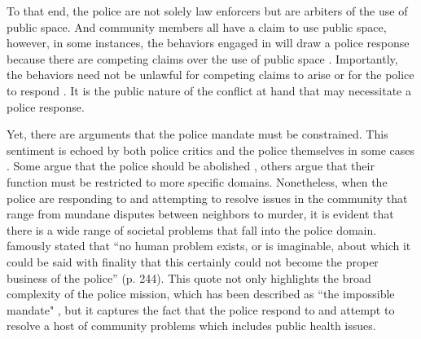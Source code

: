 \noindent To that end, the police are not solely law enforcers but are arbiters of the use of public space. And community members all have a claim to use public space, however, in some instances, the behaviors engaged in will draw a police response because there are competing claims over the use of public space \parencite{del_pozo_arrest_2022}. Importantly, the behaviors need not be unlawful for competing claims to arise or for the police to respond \parencite{thacher_order_2014}. It is the public nature of the conflict at hand that may necessitate a police response.

Yet, there are arguments that the police mandate must be constrained. This sentiment is echoed by both police critics and the police themselves in some cases \parencite{hodges_booker_2_2017}. Some argue that the police should be abolished \parencite{vitale_end_2017}, others argue that their function must be restricted to more specific domains. Nonetheless, when the police are responding to and attempting to resolve issues in the community that range from mundane disputes between neighbors to murder, it is evident that there is a wide range of societal problems that fall into the police domain. \textcite{bittner_functions_1970} famously stated that ``no human problem exists, or is imaginable, about which it could be said with finality that this certainly could not become the proper business of the police” (p. 244). This quote not only highlights the broad complexity of the police mission, which has been described as ``the impossible mandate" \parencite{manning_police_1978}, but it captures the fact that the police respond to and attempt to resolve a host of community problems which includes public health issues.

